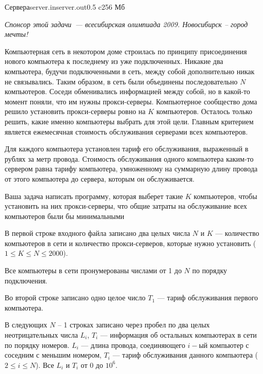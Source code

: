 
\begin{problem}{Сервера}{server.in}{server.out}{0.5 c}{256 Мб}

\begin{flushright}
{\it Спонсор этой задачи~--- всесибирская олимпиада 2009. Новосибирск -- город мечты!}
\end{flushright}

Компьютерная сеть в некотором доме строилась по принципу присоединения нового компьютера к последнему из уже подключенных. Никакие два компьютера, будучи подключенными в сеть, между собой дополнительно никак не связывались. Таким образом, в сеть были объединены последовательно $N$ компьютеров. Соседи обменивались информацией между собой, но в какой-то момент поняли, что им нужны прокси-серверы. Компьютерное сообщество дома решило установить прокси-серверы ровно на $K$ компьютеров. Осталось только решить, какие именно компьютеры выбрать для этой цели. Главным критерием является ежемесячная стоимость обслуживания серверами всех компьютеров.

Для каждого компьютера установлен тариф его обслуживания, выраженный в рублях за метр провода. Стоимость обслуживания одного компьютера каким-то сервером равна тарифу компьютера, умноженному на суммарную длину провода от этого компьютера до сервера, которым он обслуживается.

Ваша задача написать программу, которая выберет такие $K$ компьютеров, чтобы установить на них прокси-серверы, что общие затраты на обслуживание всех компьютеров были бы минимальными

\InputFile

В первой строке входного файла записано два целых числа $N$ и $K$ --- количество компьютеров в сети и количество прокси-серверов, которые нужно установить ($1 \leq K \leq N \leq 2000$).

Все компьютеры в сети пронумерованы числами от 1 до $N$ по порядку подключения.

Во второй строке записано одно целое число $T_1$ — тариф обслуживания первого компьютера.

В следующих $N$ – 1 строках записано через пробел по два целых неотрицательных числа $L_i$, $T_i$ --- информация об остальных компьютерах в сети по порядку номеров. $L_i$ --- длина провода, соединяющего $i-ый$ компьютер с соседним с меньшим номером, $T_i$ --- тариф обслуживания данного компьютера ($2 \leq i \leq N$). Все $L_i$ и $T_i$ от $0$ до $10^6$. 


\end{problem}
